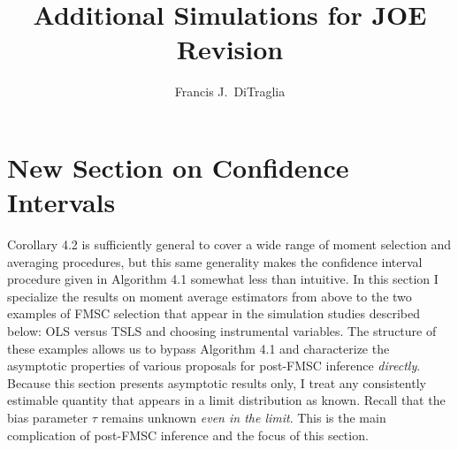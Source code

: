\documentclass[12pt,letterpaper]{article}
\title{Additional Simulations for JOE Revision}
\author{Francis J.\ DiTraglia}
\begin{document}
\maketitle

\section{New Section on Confidence Intervals}
Corollary 4.2 is sufficiently general to cover a wide range of moment selection and averaging procedures, but this same generality makes the confidence interval procedure given in Algorithm 4.1 somewhat less than intuitive.
In this section I specialize the results on moment average estimators from above to the two examples of FMSC selection that appear in the simulation studies described below: OLS versus TSLS and choosing instrumental variables.
The structure of these examples allows us to bypass Algorithm 4.1 and characterize the asymptotic properties of various proposals for post-FMSC inference \emph{directly}.
Because this section presents asymptotic results only, I treat any consistently estimable quantity that appears in a limit distribution as known.
Recall that the bias parameter $\tau$ remains unknown \emph{even in the limit}.
This is the main complication of post-FMSC inference and the focus of this section.
\end{document}

